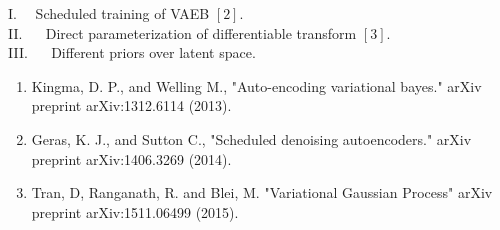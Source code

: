 \documentclass[landscape,a0b,final,a4resizeable]{include/a0poster}
\begin{document}
\begin{poster}
\begin{multicols}{3}
\vspace{0.5em}

I.~~ Scheduled training of VAEB $[2]$.\\
II. ~~ Direct parameterization of differentiable transform $[3]$.\\
III. ~~ Different priors over latent space.
\vspace{0.5em}

\begin{enumerate}
\item Kingma, D. P., and  Welling M., "Auto-encoding variational bayes." arXiv preprint arXiv:1312.6114 (2013).
\item Geras, K. J., and Sutton C., "Scheduled denoising autoencoders." arXiv preprint arXiv:1406.3269 (2014).
\item Tran, D, Ranganath, R. and Blei, M. "Variational Gaussian Process" arXiv preprint arXiv:1511.06499 (2015).
\end{enumerate}

\end{multicols}
\end{poster}
\end{document}
